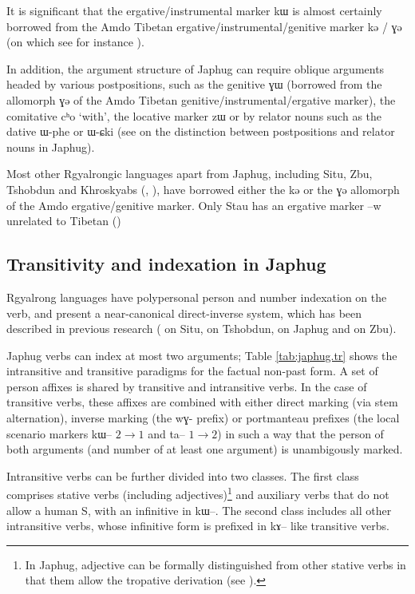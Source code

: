 \documentclass[oldfontcommands,oneside,a4paper,11pt]{article}
\newcommand{\ipa}[1]{{\phon \mbox{#1}}} %
\begin{document}
It is significant that the ergative/instrumental marker \ipa{kɯ} is almost certainly borrowed from the Amdo Tibetan ergative/instrumental/genitive marker \ipa{kə} / \ipa{ɣə} (on which see for instance \citealt[62]{haller04themchen}).

In addition, the argument structure of Japhug can require oblique arguments headed by various postpositions, such as the genitive \ipa{ɣɯ} (borrowed from the allomorph \ipa{ɣə} of the Amdo Tibetan genitive/instrumental/ergative marker), the comitative \ipa{cʰo} `with', the locative marker \ipa{zɯ} or by relator nouns such as the dative  \ipa{ɯ-phe} or \ipa{ɯ-ɕki} (see \citealt[272-4]{jacques14linking} on the distinction between postpositions and relator nouns in Japhug).

Most other Rgyalrongic languages apart from Japhug, including Situ, Zbu, Tshobdun and Khroskyabs (\citealt{jackson98morphology}, \citealt{lai13affixale}), have borrowed either the \ipa{kə} or the \ipa{ɣə} allomorph of the Amdo  ergative/genitive marker. Only Stau has an ergative marker \ipa{--w} unrelated to Tibetan (\citealt{jacques14rtau})

\subsection{Transitivity and indexation in Japhug}
Rgyalrong languages have polypersonal person and number indexation on the verb, and present a near-canonical direct-inverse system, which has been described in previous research (\citealt{delancey81direction} on Situ,  \citealt{jackson02rentongdengdi} on Tshobdun,  \citealt{jacques10inverse} on Japhug and \citealt{gongxun14agreement} on Zbu). 

Japhug verbs can index at most two arguments; Table \ref{tab:japhug.tr} shows the intransitive and transitive paradigms for the factual non-past form. A set of person affixes is shared by transitive and intransitive verbs. In the case of transitive verbs, these affixes are combined with either direct marking (via stem alternation), inverse marking (the \ipa{wɣ-} prefix) or portmanteau prefixes (the local scenario markers \ipa{kɯ--} $2\rightarrow1$ and \ipa{ta--} $1\rightarrow2$) in such a way that the person of both arguments (and number of at least one argument) is unambigously marked.

Intransitive verbs can be further divided into two classes. The first class comprises stative verbs (including adjectives)\footnote{In Japhug, adjective can be formally distinguished from other stative verbs in that them allow the tropative derivation (see \citealt{jacques13tropative}).} and auxiliary verbs that do not allow a human S, with an infinitive in \ipa{kɯ--}. The second class includes all other intransitive verbs, whose infinitive form is prefixed in \ipa{kɤ--} like transitive verbs.
\end{document}
